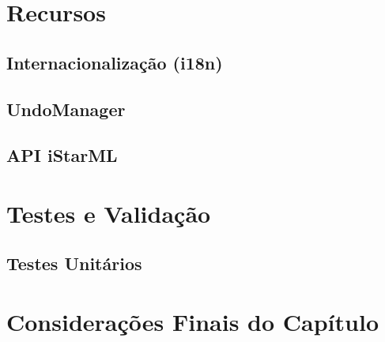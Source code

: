     \section{Recursos}
        \subsection{Internacionalização (i18n)}
        \subsection{UndoManager}
        \subsection{API iStarML}
    \section{Testes e Validação}
        \subsection{Testes Unitários}
    \section{Considerações Finais do Capítulo}

